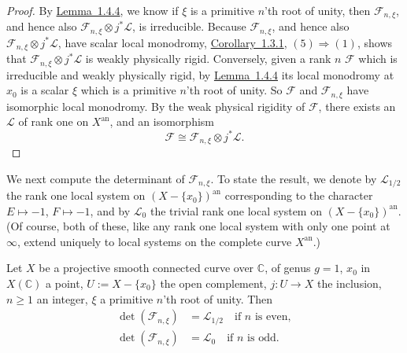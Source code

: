 \begin{proof}
By \hyperref[lem:1.4.4]{Lemma~1.4.4}, we know if \(\xi\) is a primitive \(n\)'th root of unity, then
\(\mathcal{F}_{n,\xi}\), and hence also
\(\mathcal{F}_{n,\xi}\otimes j^*\mathcal{L}\), is irreducible. Because
\(\mathcal{F}_{n,\xi}\), and hence also
\(\mathcal{F}_{n,\xi}\otimes j^*\mathcal{L}\), have scalar local monodromy,
\hyperref[cor:1.3.1]{Corollary~1.3.1}, \((5)\Rightarrow(1)\), shows that
\(\mathcal{F}_{n,\xi}\otimes j^*\mathcal{L}\) is weakly physically rigid.
Conversely, given a rank \(n\) \(\mathcal{F}\) which is irreducible and weakly
physically rigid, by \hyperref[lem:1.4.4]{Lemma~1.4.4} its local monodromy at \(x_0\) is a scalar \(\xi\)
which is a primitive \(n\)'th root of unity. So \(\mathcal{F}\) and
\(\mathcal{F}_{n,\xi}\) have isomorphic local monodromy. By the weak physical
rigidity of \(\mathcal{F}\), there exists an \(\mathcal{L}\) of rank one on
\(X^{\mathrm{an}}\), and an isomorphism
\[
  \mathcal{F}\cong \mathcal{F}_{n,\xi}\otimes j^*\mathcal{L}.
\]
\end{proof}

We next compute the determinant of \(\mathcal{F}_{n,\xi}\). To state the
result, we denote by \(\mathcal{L}_{1/2}\) the rank one local system on
\((X-\{x_0\})^{\mathrm{an}}\) corresponding to the character
\(E\mapsto -1\), \(F\mapsto -1\), and by \(\mathcal{L}_0\) the trivial rank one
local system on \((X-\{x_0\})^{\mathrm{an}}\). (Of course, both of these, like
any rank one local system with only one point at \(\infty\), extend uniquely to
local systems on the complete curve \(X^{\mathrm{an}}\).)

\setcounter{theorem}{7}
\begin{lemma}
\label{lem:1.4.8}
Let \(X\) be a projective smooth connected curve over \(\mathbb{C}\), of genus
\(g=1\), \(x_0\) in \(X(\mathbb{C})\) a point, \(U:=X-\{x_0\}\) the open
complement, \(j:U\to X\) the inclusion, \(n\geq 1\) an integer, \(\xi\) a
primitive \(n\)'th root of unity. Then
\[
  \begin{aligned}
  \det(\mathcal{F}_{n,\xi})&=\mathcal{L}_{1/2}\quad\text{if }n\text{ is even},\\
  \det(\mathcal{F}_{n,\xi})&=\mathcal{L}_0\quad\text{if }n\text{ is odd}.
  \end{aligned}
\]
\end{lemma}

